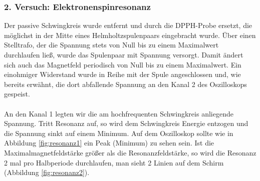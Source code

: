 \documentclass[a4paper,titlepage]{scrartcl}
\numberwithin{equation}{section}
\begin{document}
\subsubsection{2. Versuch: Elektronenspinresonanz}
Der passive Schwingkreis wurde entfernt und durch die DPPH-Probe ersetzt, die möglichst in der Mitte eines Helmholtzspulenpaars eingebracht wurde. Über einen Stelltrafo, der die Spannung stets von Null bis zu einem Maximalwert durchlaufen ließ, wurde das Spulenpaar mit Spannung versorgt. Damit ändert sich auch das Magnetfeld periodisch von Null bis zu einem Maximalwert. Ein einohmiger Widerstand wurde in Reihe mit der Spule angeschlossen und, wie bereits erwähnt, die dort abfallende Spannung an den Kanal 2 des Oszilloskops gespeist.\\ \\
An den Kanal 1 legten wir die am hochfrequenten Schwingkreis anliegende Spannung. Tritt Resonanz auf, so wird dem Schwingkreis Energie entzogen und die Spannung sinkt auf einem Minimum. Auf dem Oszilloskop sollte wie in Abbildung \ref{fig:resonanz1} ein Peak (Minimum) zu sehen sein. Ist die Maximalmagnetfeldstärke größer als die Resonanzfeldstärke, so wird die Resonanz 2 mal pro Halbperiode durchlaufen, man sieht 2 Linien auf dem Schirm (Abbildung \ref{fig:resonanz2}).
\end{document}
